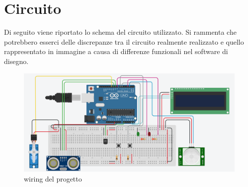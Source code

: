 \documentclass{report}
\begin{document}
\chapter{Circuito}
Di seguito viene riportato lo schema del circuito utilizzato. Si rammenta che potrebbero esserci delle discrepanze tra il circuito realmente realizzato e quello rappresentato in immagine a causa di differenze funzionali nel software di disegno.
\begin{figure}[H]
    \centering
    \includegraphics[width=\linewidth]{img/assignment-02/wiring.png}
    \caption{wiring del progetto}
    \label{fig:wiring}
\end{figure}
\end{document}
